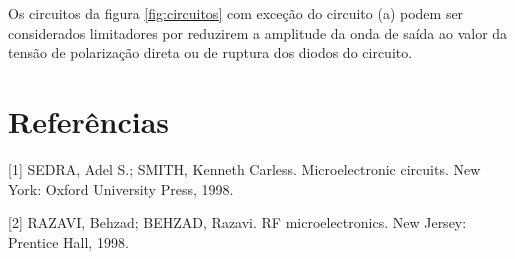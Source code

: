 \documentclass{abntex2}
\begin{document}
Os circuitos da figura \ref{fig:circuitos} com exceção do circuito (a) podem ser considerados limitadores por reduzirem a amplitude da onda de saída ao valor da tensão de polarização direta ou de ruptura dos diodos do circuito.

\section*{Referências}


[1] SEDRA, Adel S.; SMITH, Kenneth Carless. Microelectronic circuits. New York: Oxford University Press, 1998.

[2] RAZAVI, Behzad; BEHZAD, Razavi. RF microelectronics. New Jersey: Prentice Hall, 1998.
\end{document}

